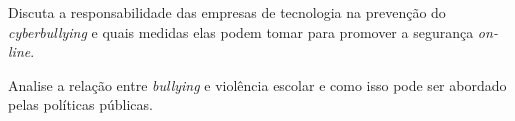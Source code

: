\thinrules[n=8,color=Blue2]


\item Discuta a responsabilidade das empresas de tecnologia na prevenção do
{\em cyberbullying} e quais medidas elas podem tomar para promover a
segurança {\em on-line}.

\thinrules[n=8,color=Blue2]


\page

\item Analise a relação entre {\em bullying} e violência escolar e como
isso pode ser abordado pelas políticas públicas.

\thinrules[n=8,color=Blue2]

\stopitemize